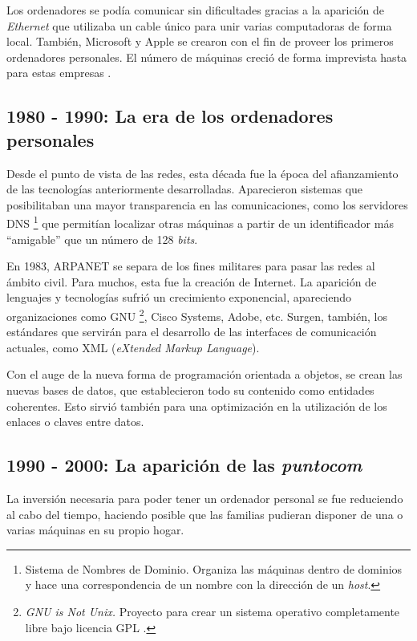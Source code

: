 Los ordenadores se podía comunicar sin dificultades gracias a 
la aparición de \emph{Ethernet} que utilizaba un cable único para 
unir varias computadoras de forma local. También, Microsoft y Apple se 
crearon con el fin de proveer los primeros ordenadores personales. El 
número de máquinas creció de forma imprevista hasta para estas 
empresas \cite{NuevasRedes}.

\subsection{1980 - 1990: La era de los ordenadores personales}
Desde el punto de vista de las redes, esta década fue la época del 
afianzamiento de las tecnologías anteriormente desarrolladas. 
Aparecieron sistemas que posibilitaban una mayor transparencia en las 
comunicaciones, como los servidores DNS \footnote{Sistema de Nombres 
de Dominio. Organiza las máquinas dentro de dominios y hace una 
correspondencia de un nombre con la dirección de un 
\emph{host}\cite{Tanenbaum}.} que permitían localizar otras máquinas 
a  partir de un identificador más ``amigable'' que un número de 
128 \emph{bits}.

En 1983, ARPANET se separa de los fines militares para pasar las redes al 
ámbito civil. Para muchos, esta fue la creación de Internet. La 
aparición de lenguajes y tecnologías sufrió un crecimiento 
exponencial, apareciendo organizaciones como GNU \footnote{\emph{GNU 
is Not Unix.} Proyecto para crear un sistema operativo completamente 
libre bajo licencia GPL \cite{LinuxKernel}.}, Cisco Systems, Adobe, 
etc. Surgen, también, los estándares que servirán para el desarrollo 
de las interfaces de comunicación actuales, como XML (\emph{eXtended Markup 
Language}).

Con el auge de la nueva forma de programación orientada a objetos, 
se crean las nuevas bases de datos, que establecieron todo su 
contenido como entidades coherentes. Esto sirvió también para una optimización 
en la utilización de los enlaces o claves entre datos.

\subsection{1990 - 2000: La aparición de las \emph{puntocom}}
\label{subsec:Los90}
La inversión necesaria para poder tener un ordenador personal se fue
reduciendo al cabo del tiempo, haciendo posible que las familias pudieran 
disponer de una o varias máquinas en su propio hogar.

